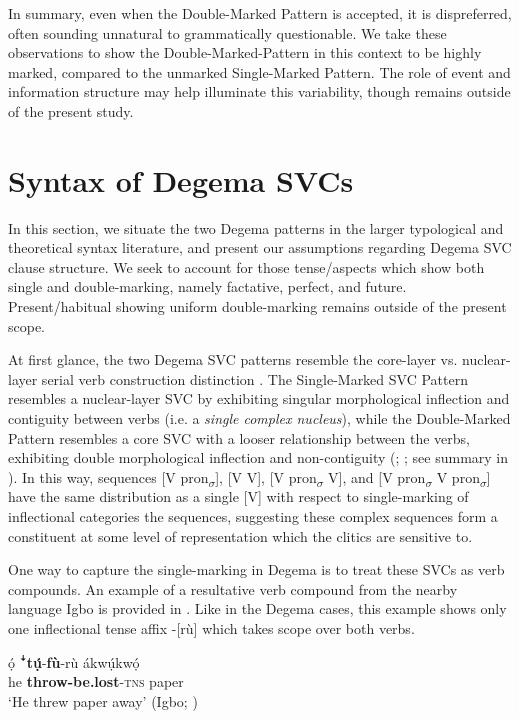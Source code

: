 \documentclass[output=paper]{langsci/langscibook}
\begin{document}
In summary, even when the Double-Marked Pattern is accepted, it is dispreferred, often sounding unnatural to grammatically questionable. We take these observations to show the Double-Marked-Pattern in this context to be highly marked, compared to the unmarked Single-Marked Pattern. The role of event and information structure may help illuminate this variability, though remains outside of the present study.

\section{Syntax of Degema SVCs}

In this section, we situate the two Degema patterns in the larger typological and theoretical syntax literature, and present our assumptions regarding Degema SVC clause structure. We seek to account for those tense/aspects which show both single and double-marking, namely factative, perfect, and future. Present/habitual showing uniform double-marking remains outside of the present scope. 

At first glance, the two Degema SVC patterns resemble the core-layer vs. nuclear-layer serial verb construction distinction \citep{Foley Olson1985}. The Single-Marked SVC Pattern resembles a nuclear-layer SVC by exhibiting singular morphological inflection and contiguity between verbs (i.e. a \textit{single complex nucleus}), while the Double-Marked Pattern resembles a core SVC with a looser relationship between the verbs, exhibiting double morphological inflection and non-contiguity (\citealt[37--39]{FoleyOlson1985}; \citealt{Crowley2002}; see summary in \citealt[126-129]{ClearyKemp2015}). In this way, sequences [V pron\textsubscript{$\sigma $}], [V V], [V pron\textsubscript{$\sigma $} V], and [V pron\textsubscript{$\sigma $} V pron\textsubscript{$\sigma $}] have the same distribution as a single [V] with respect to single-marking of inflectional categories the sequences, suggesting these complex sequences form a constituent at some level of representation which the clitics are sensitive to. 

One way to capture the single-marking in Degema is to treat these SVCs as verb compounds. An example of a resultative verb compound from the nearby language Igbo is provided in . Like in the Degema cases, this example shows only one inflectional tense affix -[rù] which takes scope over both verbs.


\ea
\gll  ọ́    ꜜ\textbf{tụ́}{}-\textbf{fù}{}-rù      ákwụ́kwọ́\\
     he  \textbf{throw-be.lost}{}-\textsc{tns}  paper\\
\glt ‘He threw paper away’ (Igbo; \citealt{Lord1975})
\z
\end{document}
